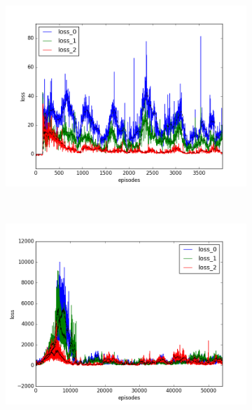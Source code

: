 \begin{figure}[t]
  \vspace{-0.5cm}
  \begin{subfigure}[t]{\figscale\linewidth}
    \hspace*{-2.75cm}
    \includegraphics[width=1.5\textwidth]
    {../results/dqn_2vs1/loss.png}
    \label{fig:dqn-2vs1-loss}
  \end{subfigure}
  ~
  \begin{subfigure}[t]{\figscale\linewidth}
    \hspace*{-1.4cm}
    \includegraphics[width=1.5\textwidth]
    {../results/ddpg_2vs1/loss.png}
    \label{fig:ddpg-2vs1-loss}
  \end{subfigure}
  ~
  \begin{subfigure}[t]{\figscale\linewidth}

\end{subfigure}
\end{figure}
